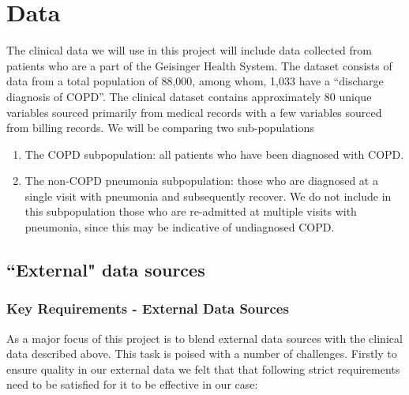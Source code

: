 \documentclass{article}
\begin{document}
\section{Data}

The clinical data we will use in this project will include data collected from 
patients who are a part of the Geisinger Health System. The dataset consists of 
data from a total population of 88,000, among whom, 1,033 have 
a ``discharge diagnosis of COPD''. The clinical dataset contains approximately 
80 unique variables sourced primarily from medical records with a few variables 
sourced from billing records. We will be comparing two sub-populations

\begin{enumerate}
\item The COPD subpopulation: all patients who have been diagnosed with COPD.
\item The non-COPD pneumonia subpopulation: those who are diagnosed at a single 
visit with pneumonia and subsequently recover. We do not include in this 
subpopulation those who are re-admitted at multiple visits with pneumonia, 
since this may be indicative of undiagnosed COPD.
\end{enumerate}

\subsection{``External" data sources}

\subsubsection{Key Requirements - External Data Sources}

As a major focus of this project is to blend external data sources with the clinical data described above. This task is poised with a number of challenges. Firstly to ensure quality in our external data we felt that that following 
strict requirements need to be satisfied for it to be effective in our case:
\end{document}
